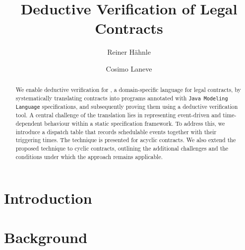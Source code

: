\documentclass[runningheads]{llncs}
\begin{document}

\title{Deductive Verification of Legal Contracts}


\author{Reiner H\"ahnle \and
  Cosimo Laneve}



\maketitle              

\begin{abstract}%
  We enable deductive verification for {\Stipula}, a domain-specific
  language for legal contracts, by systematically translating
  contracts into {\Java} programs annotated with {\tt Java Modeling
    Language} specifications, and subsequently proving them using
a deductive verification tool.
  A central challenge of the translation lies in representing
  event-driven and time-dependent behaviour within a static
  specification framework. To address this, we introduce a dispatch
  table that records schedulable events together with their triggering
  times.
  The technique is presented for acyclic {\Stipula} contracts. We also
  extend the proposed technique to cyclic contracts, outlining the
  additional challenges and the conditions under which the approach
  remains applicable.

\end{abstract}

\section{Introduction}
\label{sec:introduction}

 
\section{Background}
\label{sec:background}

\end{document}
